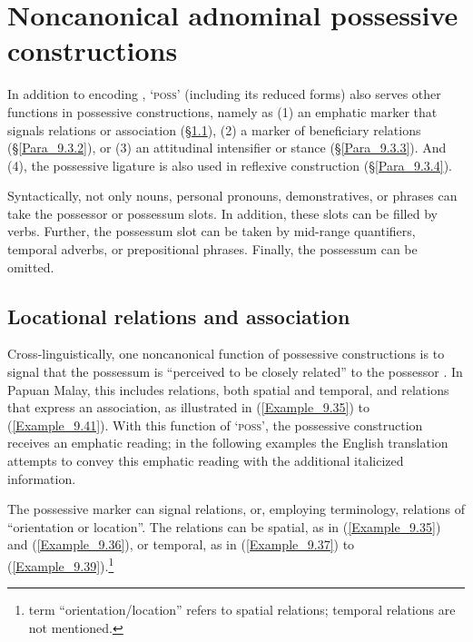 \section{Noncanonical adnominal possessive constructions}
\label{Para_9.3}
In addition to encoding ,  ‘\textsc{poss}’ (including its reduced forms) also serves other functions in possessive constructions, namely as (1) an emphatic marker that signals  relations or association (§\ref{Para_9.3.1}), (2) a marker of beneficiary relations (§\ref{Para_9.3.2}), or (3) an attitudinal intensifier or stance (§\ref{Para_9.3.3}). And (4), the possessive ligature is also used in reflexive construction (§\ref{Para_9.3.4}).



Syntactically, not only nouns, personal pronouns, demonstratives, or  phrases can take the possessor or possessum slots. In addition, these slots can be filled by verbs. Further, the possessum slot can be taken by mid-range quantifiers, temporal adverbs, or prepositional phrases. Finally, the possessum can be omitted.


\subsection{Locational relations and association}
\label{Para_9.3.1}
Cross-linguistically, one noncanonical function of possessive constructions is to signal that the possessum is “perceived to be closely related” to the possessor \citep[278]{Dixon.2010}. In Papuan Malay, this includes  relations, both spatial and temporal, and relations that express an association, as illustrated in (\ref{Example_9.35}) to (\ref{Example_9.41}). With this function of  ‘\textsc{poss}’, the possessive construction receives an emphatic reading; in the following examples the English translation attempts to convey this emphatic reading with the additional italicized information.



The possessive marker can signal  relations, or, employing  terminology, relations of “orientation or location”. The  relations can be spatial, as in (\ref{Example_9.35}) and (\ref{Example_9.36}), or temporal, as in (\ref{Example_9.37}) to (\ref{Example_9.39}).\footnote{ term “orientation/location” refers to spatial relations; temporal relations are not mentioned.}



